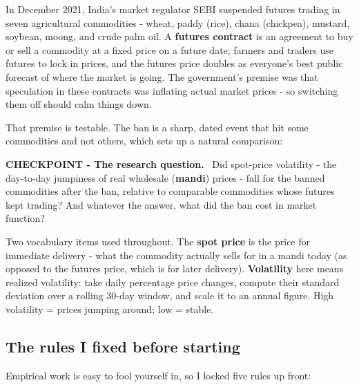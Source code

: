 \documentclass[11pt]{article}
\newenvironment{checkpoint}[1]
  {\begin{framed}\noindent\textbf{CHECKPOINT - #1.}\ }
  {\end{framed}}
\begin{document}
In December 2021, India's market regulator SEBI suspended futures trading in seven
agricultural commodities - wheat, paddy (rice), chana (chickpea), mustard, soybean, moong,
and crude palm oil. A \textbf{futures contract} is an agreement to buy or sell a commodity
at a fixed price on a future date; farmers and traders use futures to lock in prices, and
the futures price doubles as everyone's best public forecast of where the market is going.
The government's premise was that speculation in these contracts was inflating actual
market prices - so switching them off should calm things down.

That premise is testable. The ban is a sharp, dated event that hit some commodities and
not others, which sets up a natural comparison:

\begin{checkpoint}{The research question}
Did spot-price volatility - the day-to-day jumpiness of real wholesale (\textbf{mandi})
prices - fall for the banned commodities after the ban, relative to comparable commodities
whose futures kept trading? And whatever the answer, what did the ban cost in market
function?
\end{checkpoint}

Two vocabulary items used throughout. The \textbf{spot price} is the price for immediate
delivery - what the commodity actually sells for in a mandi today (as opposed to the
futures price, which is for later delivery). \textbf{Volatility} here means realized
volatility: take daily percentage price changes, compute their standard deviation over a
rolling 30-day window, and scale it to an annual figure. High volatility = prices jumping
around; low = stable.

\subsection{The rules I fixed before starting}

Empirical work is easy to fool yourself in, so I locked five rules up front:
\end{document}
